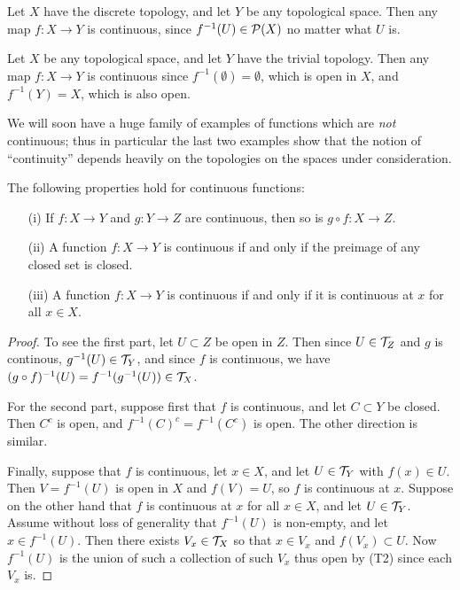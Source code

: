 \begin{example}
  Let $X$ have the discrete topology, and let $Y$ be any topological space. Then any map $f : X \to Y$ is continuous, since $f^{-1}(U) \in \mathcal{P}(X)$ no matter what $U$ is.
\end{example}
\begin{example}
  Let $X$ be any topological space, and let $Y$ have the trivial topology. Then any map $f : X \to Y$ is continuous since $f^{-1}(\emptyset) = \emptyset$, which is open in $X$, and $f^{-1}(Y) = X$, which is also open.
\end{example}
We will soon have a huge family of examples of functions which are \emph{not} continuous; thus in particular the last two examples show that the notion of ``continuity'' depends heavily on the topologies on the spaces under consideration.
\begin{thm}
  \label{continuous-props}
  The following properties hold for continuous functions:
  \begin{enumerate}
    \item[(i)] If $f: X \to Y$ and $g : Y \to Z$ are continuous, then so is $g \circ f : X \to Z$.
    \item[(ii)] A function $f : X \to Y$ is continuous if and only if the preimage of any closed set is closed.
    \item[(iii)] A function $f : X \to Y$ is continuous if and only if it is continuous at $x$ for all $x \in X$.
  \end{enumerate}
\end{thm}
\begin{proof}
  To see the first part, let $U \subset Z$ be open in $Z$. Then since $U \in \mathcal{T}_Z$ and $g$ is continous, $g^{-1}(U) \in \mathcal{T}_Y$, and since $f$ is continuous, we have $(g \circ f)^{-1}(U) = f^{-1}(g^{-1}(U)) \in \mathcal{T}_X$.
  
  For the second part, suppose first that $f$ is continuous, and let $C \subset Y$ be closed. Then $C^c$ is open, and $f^{-1}(C)^c = f^{-1}(C^c)$ is open. The other direction is similar.
  
  Finally, suppose that $f$ is continuous, let $x \in X$, and let $U \in \mathcal{T}_Y$ with $f(x) \in U$. Then $V = f^{-1}(U)$ is open in $X$ and $f(V) = U$, so $f$ is continuous at $x$. Suppose on the other hand that $f$ is continuous at $x$ for all $x \in X$, and let $U \in \mathcal{T}_Y$. Assume without loss of generality that $f^{-1}(U)$ is non-empty, and let $x \in f^{-1}(U)$. Then there exists $V_x \in \mathcal{T}_X$ so that $x \in V_x$ and $f(V_x) \subset U$. Now $f^{-1}(U)$ is the union of such a collection of such $V_x$ thus open by (T2) since each $V_x$ is.
\end{proof}


